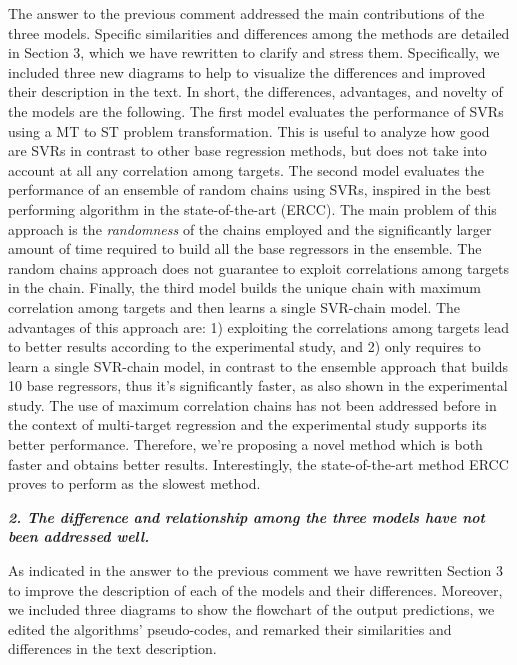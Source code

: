 \documentclass[a4paper,notitlepage]{article}
\begin{document}
\noindent The answer to the previous comment addressed the main contributions of the three models. Specific similarities and differences among the methods are detailed in Section 3, which we have rewritten to clarify and stress them. Specifically, we included three new diagrams to help to visualize the differences and improved their description in the text. In short, the differences, advantages, and novelty of the models are the following. The first model evaluates the performance of SVRs using a MT to ST problem transformation. This is useful to analyze how good are SVRs in contrast to other base regression methods, but does not take into account at all any correlation among targets. The second model evaluates the performance of an ensemble of random chains using SVRs, inspired in the best performing algorithm in the state-of-the-art (ERCC). The main problem of this approach is the \textit{randomness} of the chains employed and the significantly larger amount of time required to build all the base regressors in the ensemble. The random chains approach does not guarantee to exploit correlations among targets in the chain. Finally, the third model builds the unique chain with maximum correlation among targets and then learns a single SVR-chain model. The advantages of this approach are: 1) exploiting the correlations among targets lead to better results according to the experimental study, and 2) only requires to learn a single SVR-chain model, in contrast to the ensemble approach that builds 10 base regressors, thus it's significantly faster, as also shown in the experimental study. The use of maximum correlation chains has not been addressed before in the context of multi-target regression and the experimental study supports its better performance. Therefore, we're proposing a novel method which is both faster and obtains better results. Interestingly, the state-of-the-art method ERCC proves to perform as the slowest method.
 
\noindent \textbf{\textit{2. The difference and relationship among the three models have not been addressed well.}}
 
\medskip

\noindent As indicated in the answer to the previous comment we have rewritten Section 3 to improve the description of each of the models and their differences. Moreover, we included three diagrams to show the flowchart of the output predictions, we edited the algorithms' pseudo-codes, and remarked their similarities and differences in the text description.
\end{document}
